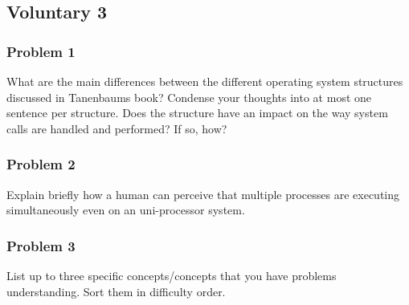 
\subsection*{Voluntary 3}

\subsubsection*{Problem 1}
What are the main differences between the different operating system 
structures discussed in Tanenbaums book? Condense your thoughts into at 
most one sentence per structure. Does the structure have an impact on 
the way system calls are handled and performed? If so, how?

\subsubsection*{Problem 2}
Explain briefly how a human can perceive that multiple processes are 
executing simultaneously even on an uni-processor system.

\subsubsection*{Problem 3}
List up to three specific concepts/concepts that you have problems 
understanding. Sort them in difficulty order.